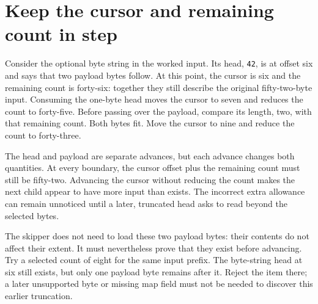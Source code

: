 \section{Keep the cursor and remaining count in step}
Consider the optional byte string in the worked input. Its head, \texttt{42}, is at
offset six and says that two payload bytes follow. At this point, the cursor is six
and the remaining count is forty-six: together they still describe the original
fifty-two-byte input. Consuming the one-byte head moves the cursor to seven and
reduces the count to forty-five. Before passing over the payload, compare its length,
two, with that remaining count. Both bytes fit. Move the cursor to nine and reduce
the count to forty-three.

The head and payload are separate advances, but each advance changes both quantities.
At every boundary, the cursor offset plus the remaining count must still be fifty-two.
Advancing the cursor without reducing the count makes the next child appear to have
more input than exists. The incorrect extra allowance can remain unnoticed until a
later, truncated head asks to read beyond the selected bytes.

The skipper does not need to load these two payload bytes: their contents do not affect
their extent. It must nevertheless prove that they exist before advancing. Try a selected
count of eight for the same input prefix. The byte-string head at six still exists,
but only one payload byte remains after it. Reject the item there; a later unsupported
byte or missing map field must not be needed to discover this earlier truncation.
